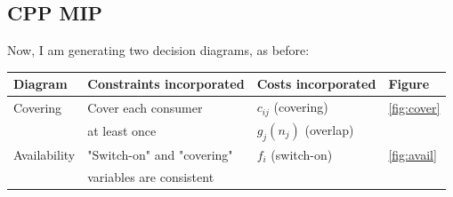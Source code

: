 \documentclass[11pt]{article}
\begin{document}
\subsection{CPP MIP}
\label{sec:orgf3ee3b1}
Now, I am generating two decision diagrams, as before:

\begin{center}
\begin{tabular}{llll}
\textbf{Diagram} & \textbf{Constraints incorporated} & \textbf{Costs incorporated} & \textbf{Figure}\\
\hline
\hline
Covering & Cover each consumer & \(c_{ij}\) (covering) & \ref{fig:cover}\\
 & at least once & \(g_j(n_j)\) (overlap) & \\
\hline
Availability & "Switch-on" and "covering" & \(f_i\) (switch-on) & \ref{fig:avail}\\
 & variables are consistent &  & \\
\hline
\end{tabular}
\end{center}
\end{document}
